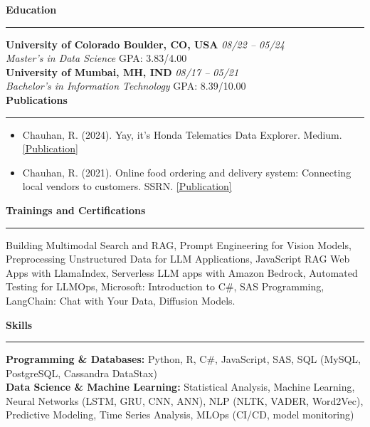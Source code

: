 \documentclass[10pt]{article}
\newcommand{\sectiontitle}[1]{\vspace{0.5em}\textbf{\large #1}\vspace{0.5em}\hrule\vspace{0.5em}}
\newcommand{\jobtitle}[1]{\textbf{#1}}
\newcommand{\daterange}[1]{\hfill\textit{#1}}
\begin{document}
\sectiontitle{Education}
\jobtitle{University of Colorado Boulder, CO, USA} \daterange{08/22 – 05/24} \\
\textit{Master’s in Data Science} \hfill GPA: 3.83/4.00 \\

\jobtitle{University of Mumbai, MH, IND} \daterange{08/17 – 05/21} \\
\textit{Bachelor’s in Information Technology} \hfill GPA: 8.39/10.00 \\

\sectiontitle{Publications}
\begin{itemize}[leftmargin=*]
    \item Chauhan, R. (2024). Yay, it’s Honda Telematics Data Explorer. Medium. \href{https://medium.com}{[Publication]}
    \item Chauhan, R. (2021). Online food ordering and delivery system: Connecting local vendors to customers. SSRN. \href{https://ssrn.com}{[Publication]}
\end{itemize}

\sectiontitle{Trainings and Certifications}
Building Multimodal Search and RAG, Prompt Engineering for Vision Models, Preprocessing Unstructured Data for LLM Applications, JavaScript RAG Web Apps with LlamaIndex, Serverless LLM apps with Amazon Bedrock, Automated Testing for LLMOps, Microsoft: Introduction to C\#, SAS Programming, LangChain: Chat with Your Data, Diffusion Models.

\sectiontitle{Skills}
\textbf{Programming \& Databases:} Python, R, C\#, JavaScript, SAS, SQL (MySQL, PostgreSQL, Cassandra DataStax) \\
\textbf{Data Science \& Machine Learning:} Statistical Analysis, Machine Learning, Neural Networks (LSTM, GRU, CNN, ANN), NLP (NLTK, VADER, Word2Vec), Predictive Modeling, Time Series Analysis, MLOps (CI/CD, model monitoring)
\end{document}
